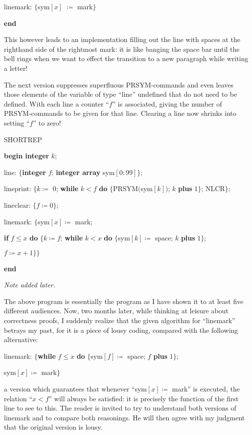 \noindent
\quad linemark: $\{$sym$[x]$ $\coloneq$ mark$\}$

\noindent
\textbf{end}

This however leads to an implementation filling out the line with spaces at the righthand side of the rightmost mark: it is like banging the space bar until the bell rings when we want to effect the transition to a new paragraph while writing a letter!

The next version suppresses superfluous PRSYM-commands and even leaves those elements of the variable of type ``line'' undefined that do not need to be defined. With each line a counter ``$f$'' is associated, giving the number of PRSYM-commands to be given for that line. Clearing a line now shrinks into setting ``$f$'' to zero!

\noindent
SHORTREP

\noindent
\textbf{begin integer} $k$;

\noindent
\quad line: $\{$\textbf{integer} $f$; \textbf{integer array} sym$[0 : 99]\}$;

\noindent
\quad lineprint: $\{k \coloneq$ 0; \textbf{while} $k < f$ \textbf{do} $\{$PRSYM$($sym$[k])$; $k$ \textbf{plus} $1\}$; NLCR$\}$;

\noindent
\quad lineclear: $\{f \coloneq 0\}$;

\noindent
\quad linemark: $\{$sym$[x] \coloneq$ mark;

\noindent
\quad \textbf{if} $f \leqslant x$ \textbf{do} $\{k \coloneq f$; \textbf{while} $k < x$ \textbf{do} $\{$sym$[k] \coloneq$ space; $k$ \textbf{plus} $1\}$;

\noindent
\quad \quad $f \coloneq x + 1\}\}$

\noindent
\textbf{end}

\noindent
\textit{Note added later.}

The above program is essentially the program as I have shown it to at least five different audiences. Now, two months later, while thinking at leisure about correctness proofs, I suddenly realize that the given algorithm for ``linemark'' betrays my past, for it is a piece of lousy coding, compared with the following alternative:

linemark: $\{$\textbf{while} $f \leqslant x$ \textbf{do} $\{$sym$[f] \coloneq$ space; $f$ \textbf{plus} $1\};$
	
\quad sym$[x] \coloneq$ mark$\}$

\noindent
a version which guarantees that whenever ``sym$[x] \coloneq$ mark'' is executed, the relation ``$x < f$'' will always be satisfied: it is precisely the function of the first line to see to this. The reader is invited to try to understand both versions of linemark and to compare both reasonings. He will then agree with my judgment that the original version is lousy.

